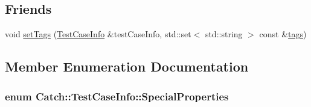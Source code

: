 \subsection*{Friends}
\begin{DoxyCompactItemize}
\item 
void \hyperlink{struct_catch_1_1_test_case_info_addc10c770e56f49da5baa0c76cf25bd5}{set\-Tags} (\hyperlink{struct_catch_1_1_test_case_info}{Test\-Case\-Info} \&test\-Case\-Info, std\-::set$<$ std\-::string $>$ const \&\hyperlink{struct_catch_1_1_test_case_info_a045f62e7719a8760a5b456f7fd2dc97c}{tags})
\end{DoxyCompactItemize}


\subsection{Member Enumeration Documentation}
\hypertarget{struct_catch_1_1_test_case_info_a39b232f74b4a7a6f2183b96759027eac}{
\subsubsection[{Special\-Properties}]{\setlength{\rightskip}{0pt plus 5cm}enum {\bf Catch\-::\-Test\-Case\-Info\-::\-Special\-Properties}}}\label{struct_catch_1_1_test_case_info_a39b232f74b4a7a6f2183b96759027eac}
